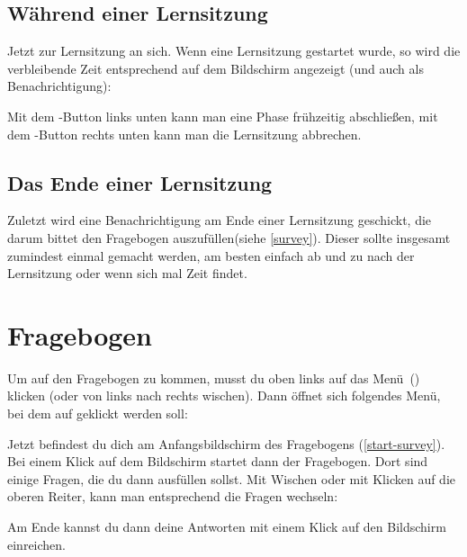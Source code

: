 \documentclass[ngerman]{tutorial}
\begin{document}
\subsection{Während einer Lernsitzung}
Jetzt zur Lernsitzung an sich. Wenn eine Lernsitzung gestartet wurde, so wird die verbleibende Zeit entsprechend auf dem Bildschirm angezeigt (und auch als Benachrichtigung):
\begin{center}
    \qquad
\end{center}
Mit dem \button{\,~{\tiny\faStepForward}~\,}-Button links unten kann man eine Phase frühzeitig abschließen, mit dem \button{\,~{\tiny\faTimesCircle}~\,}-Button rechts unten kann man die Lernsitzung abbrechen.

\subsection{Das Ende einer Lernsitzung}
Zuletzt wird eine Benachrichtigung am Ende einer Lernsitzung geschickt, die darum bittet den Fragebogen auszufüllen(siehe \autoref{survey}). Dieser sollte insgesamt zumindest einmal gemacht werden, am besten einfach ab und zu nach der Lernsitzung oder wenn sich mal Zeit findet.

\clearpage
\section{Fragebogen}
Um auf den Fragebogen zu kommen, musst du oben links auf das Menü~(\faNavicon) klicken (oder von links nach rechts wischen). Dann öffnet sich folgendes Menü, bei dem auf  geklickt werden soll:
\begin{center}
    \quad{}\quad{}
\end{center}
Jetzt befindest du dich am Anfangsbildschirm des Fragebogens (\autoref{start-survey}). Bei einem Klick auf dem Bildschirm startet dann der Fragebogen.
%
Dort sind einige Fragen, die du dann ausfüllen sollst. Mit Wischen oder mit Klicken auf die oberen Reiter, kann man entsprechend die Fragen wechseln:
\begin{center}
    \quad{}\quad{}
\end{center}
\noindent Am Ende kannst du dann deine Antworten mit einem Klick auf den Bildschirm einreichen.
\end{document}
